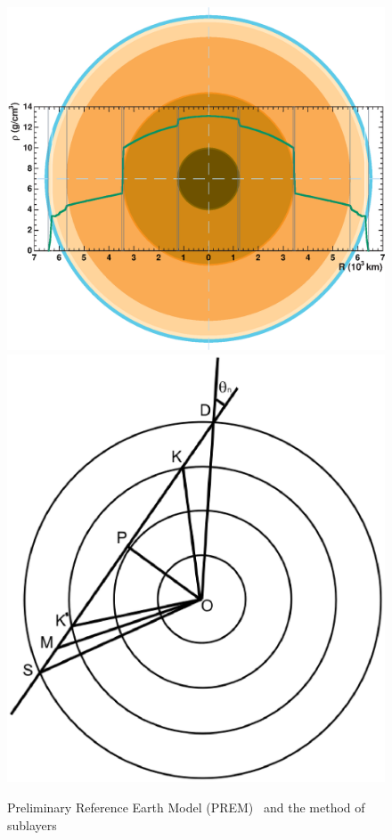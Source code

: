 \begin{figure}[htb!]
\begin{center}
\includegraphics[width=\columnwidth]{./MSW/Earth_PREM.eps}
\includegraphics[width=\columnwidth]{./MSW/Earth_Layers.eps}
\caption{\label{PREM}Preliminary Reference Earth Model (PREM)~\cite{Dziewonski:1981xy} and the method of sublayers}
\end{center}
\end{figure}


